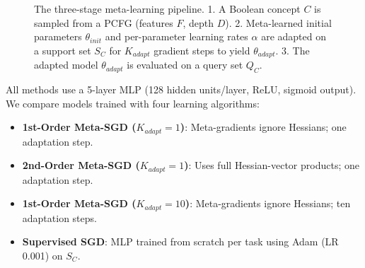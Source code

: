 \documentclass{article}
\begin{document}
\begin{figure}[ht]
\centering
{}
\caption{The three-stage meta-learning pipeline. 1. A Boolean concept $C$ is sampled from a PCFG (features $F$, depth $D$). 2. Meta-learned initial parameters $\theta_{init}$ and per-parameter learning rates $\alpha$ are adapted on a support set $S_C$ for $K_{adapt}$ gradient steps to yield $\theta_{adapt}$. 3. The adapted model $\theta_{adapt}$ is evaluated on a query set $Q_C$.}\label{fig:meta_episode}
\end{figure}

All methods use a 5-layer MLP (128 hidden units/layer, ReLU, sigmoid output). We compare models trained with four learning algorithms:
\begin{itemize}
    \item \textbf{1st-Order Meta-SGD ($K_{adapt}=1$)}: Meta-gradients ignore Hessians; one adaptation step.
    \item \textbf{2nd-Order Meta-SGD ($K_{adapt}=1$)}: Uses full Hessian-vector products; one adaptation step.
    \item \textbf{1st-Order Meta-SGD ($K_{adapt}=10$)}: Meta-gradients ignore Hessians; ten adaptation steps.
    \item \textbf{Supervised SGD}: MLP trained from scratch per task using Adam \citep{Kingma2014adam} (LR 0.001) on $S_C$.
\end{itemize}
\end{document}
